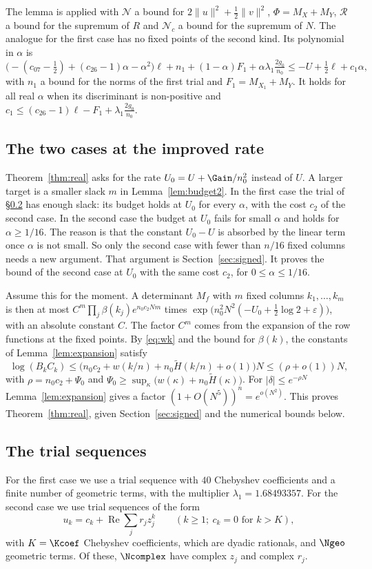 The lemma is applied with $\mathcal N$ a bound for $2\|u\|^2+\frac12\|v\|^2$, $\Phi=M_X+M_Y$, $\mathcal R$ a
bound for the supremum of $R$ and $\mathcal N_c$ a bound for the supremum of $N$. The analogue for the first
case has no fixed points of the second kind. Its polynomial in $\alpha$ is
\[
 \bigl(-(c_{07}-\tfrac12)+(c_{26}-1)\alpha-\alpha^2\bigr)\ell+n_1+(1-\alpha)F_1+\alpha\lambda_1\tfrac{2g_0}{n_0}
 \le-U+\tfrac12\ell+c_1\alpha,
\]
with $n_1$ a bound for the norms of the first trial and $F_1=M_{X_1}+M_Y$. It holds for all real $\alpha$
when its discriminant is non-positive and $c_1\le(c_{26}-1)\ell-F_1+\lambda_1\tfrac{2g_0}{n_0}$.

\subsection{The two cases at the improved rate}\label{ssec:cases}
Theorem~\ref{thm:real} asks for the rate $U_0=U+\Gain/n_0^2$ instead of $U$. A larger target is a smaller
slack $m$ in Lemma~\ref{lem:budget2}. In the first case the trial of \S\ref{ssec:trials} has enough slack:
its budget holds at $U_0$ for every $\alpha$, with the cost $c_2$ of the second case. In the second case the
budget at $U_0$ fails for small $\alpha$ and holds for $\alpha\ge1/16$. The reason is that the constant
$U_0-U$ is absorbed by the linear term once $\alpha$ is not small. So only the second case with fewer than
$n/16$ fixed columns needs a new argument. That argument is Section~\ref{sec:signed}. It proves the bound of
the second case at $U_0$ with the same cost $c_2$, for $0\le\alpha\le1/16$.

Assume this for the moment. A determinant $M_f$ with $m$ fixed columns $k_1,\ldots,k_m$ is then at most
$C^m\prod_j\beta(k_j)e^{n_0c_2Nm}$ times $\exp\bigl(n_0^2N^2(-U_0+\frac12\log2+\varepsilon)\bigr)$, with an
absolute constant $C$. The factor $C^m$ comes from the expansion of the row functions at the fixed points.
By \eqref{eq:wk} and the bound for $\beta(k)$, the constants of Lemma~\ref{lem:expansion} satisfy
\[
 \log(B_kC_k)\le\bigl(n_0c_2+w(k/n)+n_0\tilde H(k/n)+o(1)\bigr)N\le(\rho+o(1))N,
\]
with $\rho=n_0c_2+\Psi_0$ and $\Psi_0\ge\sup_\kappa\bigl(w(\kappa)+n_0\tilde H(\kappa)\bigr)$. For
$|\delta|\le e^{-\rho N}$ Lemma~\ref{lem:expansion} gives a factor $(1+O(N^5))^n=e^{o(N^2)}$. This proves
Theorem~\ref{thm:real}, given Section~\ref{sec:signed} and the numerical bounds below.

\subsection{The trial sequences}\label{ssec:trials}
For the first case we use a trial sequence with $40$ Chebyshev coefficients and a finite number of geometric
terms, with the multiplier $\lambda_1=1.68493357$. For the second case we use trial sequences of the form
\begin{equation}\label{eq:trial}
 u_k=c_k+\operatorname{Re}\sum_jr_jz_j^k\qquad(k\ge1;\ c_k=0\text{ for }k>K),
\end{equation}
with $K=\Kcoef$ Chebyshev coefficients, which are dyadic rationals, and $\Ngeo$ geometric terms. Of these,
$\Ncomplex$ have complex $z_j$ and complex $r_j$.


